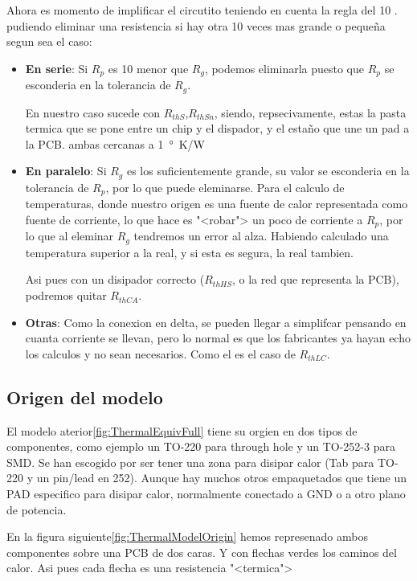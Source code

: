 Ahora es momento de implificar el circutito teniendo en cuenta la regla del 10
. pudiendo eliminar una resistencia
si hay otra 10 veces mas grande o pequeña segun sea el caso:
\begin{itemize}
    \item \textbf{En serie}: Si $R_p$ es 10 menor que $R_g$, podemos eliminarla puesto que
          $R_p$ se esconderia en la tolerancia de $R_g$.

          En nuestro caso sucede con $R_{thS}$,$R_{thSn}$, siendo, repsecivamente, estas la pasta
          termica que se pone entre un chip y el dispador, y el estaño que une un pad a la PCB.
          ambas cercanas a \SI{1}{\degree\kelvin/\watt}
    \item \textbf{En paralelo}: Si $R_g$ es los suficientemente grande, su valor se esconderia
          en la tolerancia de $R_p$, por lo que puede eleminarse. Para el calculo de temperaturas, donde nuestro
          origen es una fuente de calor representada como fuente de corriente, lo que hace es "<robar">
          un poco de corriente a $R_p$, por lo que al eleminar $R_g$ tendremos un error al alza.
          Habiendo calculado una temperatura superior a la real, y si esta es segura, la real tambien.

          Asi pues con un disipador correcto ($R_{thHS}$, o la red que representa la PCB), podremos quitar
          $R_{thCA}$.
    \item \textbf{Otras}: Como la conexion en delta, se pueden llegar a simplifcar
          pensando en cuanta corriente se llevan, pero lo normal es que los fabricantes ya
          hayan echo los calculos y no sean necesarios. Como el es el caso de $R_{thLC}$.
\end{itemize}

\subsection{Origen del modelo}

El modelo aterior\ref{fig:ThermalEquivFull} tiene su orgien en dos tipos de componentes, como ejemplo
un TO-220 para through hole y un TO-252-3 para SMD. Se han escogido por ser tener una zona
para disipar calor (Tab para TO-220 y un pin/lead en 252). Aunque hay muchos otros empaquetados
que tiene un PAD especifico para disipar calor, normalmente conectado a GND o a otro
plano de potencia.

En la figura siguiente\ref{fig:ThermalModelOrigin} hemos represenado ambos componentes sobre una PCB
de dos caras. Y con flechas verdes los caminos del calor. Asi pues cada flecha es una resistencia "<termica">

